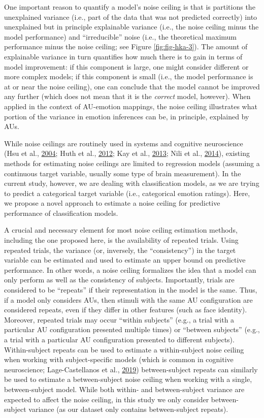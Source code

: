 \documentclass[12pt,american,a4paper,oneside,]{memoir} %
\begin{document}
One important reason to quantify a model's noise ceiling is that is partitions the unexplained variance (i.e., part of the data that was not predicted correctly) into unexplained but in principle explainable variance (i.e., the noise ceiling minus the model performance) and ``irreducible'' noise (i.e., the theoretical maximum performance minus the noise ceiling; see Figure \ref{fig:fig-hka-3}). The amount of explainable variance in turn quantifies how much there is to gain in terms of model improvement: if this component is large, one might consider different or more complex models; if this component is small (i.e., the model performance is at or near the noise ceiling), one can conclude that the model cannot be improved any further (which does not mean that it is the \emph{correct} model, however). When applied in the context of AU-emotion mappings, the noise ceiling illustrates what portion of the variance in emotion inferences can be, in principle, explained by AUs.

While noise ceilings are routinely used in systems and cognitive neuroscience (Hsu et al., \protect\hyperlink{ref-Hsu2004-hs}{2004}; Huth et al., \protect\hyperlink{ref-Huth2012-yc}{2012}; Kay et al., \protect\hyperlink{ref-Kay2013-ch}{2013}; Nili et al., \protect\hyperlink{ref-Nili2014-ar}{2014}), existing methods for estimating noise ceilings are limited to regression models (assuming a continuous target variable, usually some type of brain measurement). In the current study, however, we are dealing with classification models, as we are trying to predict a categorical target variable (i.e., categorical emotion ratings). Here, we propose a novel approach to estimate a noise ceiling for predictive performance of classification models.

A crucial and necessary element for most noise ceiling estimation methods, including the one proposed here, is the availability of repeated trials. Using repeated trials, the variance (or, inversely, the ``consistency'') in the target variable can be estimated and used to estimate an upper bound on predictive performance. In other words, a noise ceiling formalizes the idea that a model can only perform as well as the consistency of subjects. Importantly, trials are considered to be ``repeats'' if their representation in the model is the same. Thus, if a model only considers AUs, then stimuli with the same AU configuration are considered repeats, even if they differ in other features (such as face identity). Moreover, repeated trials may occur ``within subjects'' (e.g., a trial with a particular AU configuration presented multiple times) or ``between subjects'' (e.g., a trial with a particular AU configuration presented to different subjects). Within-subject repeats can be used to estimate a within-subject noise ceiling when working with subject-specific models (which is common in cognitive neuroscience; Lage-Castellanos et al., \protect\hyperlink{ref-lage2019methods}{2019}) between-subject repeats can similarly be used to estimate a between-subject noise ceiling when working with a single, between-subject model. While both within- and between-subject variance are expected to affect the noise ceiling, in this study we only consider between-subject variance (as our dataset only contains between-subject repeats).
\end{document}
